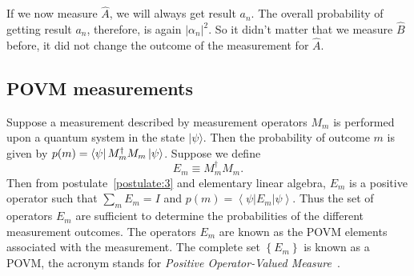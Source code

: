 If we now measure $\hat A$, we will always get result $a_n$. The overall probability of getting result $a_n$, therefore, is again $|\alpha_n|^2$. So it didn't matter that we measure $\hat B$ before, it did not change the outcome of the measurement for $\hat A$.

\subsection{POVM measurements}
Suppose a measurement described by measurement operators $M_{m}$ is performed upon a quantum system in the state $|\psi\rangle$. Then the probability of outcome $m$ is given by $p(m)=\bra{\psi}M_{m}^{\dagger} M_{m}\ket{\psi}$. Suppose we define
\begin{equation}
E_{m} \equiv M_{m}^{\dagger} M_{m}.
\end{equation}
Then from postulate~\ref{postulate:3} and elementary linear algebra, $E_{m}$ is a positive operator such that $\sum_{m} E_{m}=I$ and $p(m)=\left\langle\psi\left|E_{m}\right| \psi\right\rangle$. Thus the set of operators $E_{m}$ are sufficient to determine the probabilities of the different measurement outcomes. The operators $E_{m}$ are known as the POVM elements associated with the measurement. The complete set $\left\{E_{m}\right\}$ is known as a POVM, the acronym stands for \emph{Positive Operator-Valued Measure}~\cite{NielsenChuang}.
